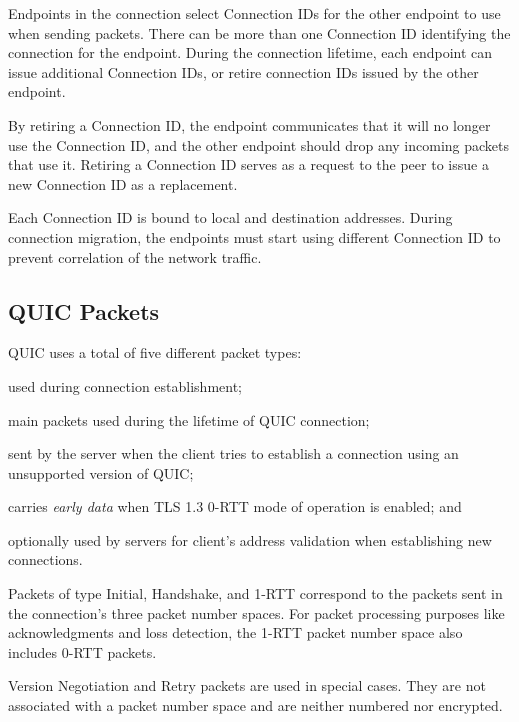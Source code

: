 Endpoints in the connection select Connection IDs for the other endpoint to use when sending
packets. There can be more than one Connection ID identifying the connection for the endpoint.
During the connection lifetime, each endpoint can issue additional Connection IDs, or retire
connection IDs issued by the other endpoint.

By retiring a Connection ID, the endpoint communicates that it will no longer use the Connection ID,
and the other endpoint should drop any incoming packets that use it. Retiring a Connection ID serves
as a request to the peer to issue a new Connection ID as a replacement.

Each Connection ID is bound to local and destination addresses. During connection migration, the
endpoints must start using different Connection ID to prevent correlation of the network traffic.

\subsection{QUIC Packets}

QUIC uses a total of five different packet types:

\begin{enumerate}

   used during connection establishment;

   main packets used during the lifetime of QUIC connection;

   sent by the server when the client tries to establish a connection
  using an unsupported version of QUIC\@;

   carries \textit{early data} when TLS 1.3 0-RTT mode of operation is enabled; and

   optionally used by servers for client's address validation when establishing new
  connections.

\end{enumerate}

Packets of type Initial, Handshake, and 1-RTT correspond to the packets sent in the connection's
three packet number spaces. For packet processing purposes like acknowledgments and loss detection,
the 1-RTT packet number space also includes 0-RTT packets.

Version Negotiation and Retry packets are used in special cases. They are not associated with a
packet number space and are neither numbered nor encrypted.

